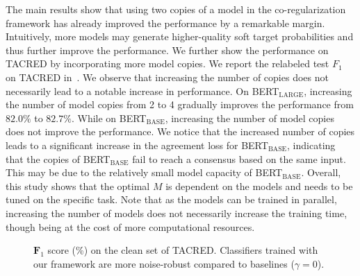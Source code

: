 \documentclass[11pt]{article}
\newcommand{\stitle}[1]{\vspace{0.3em}\noindent{\bf #1}}
\begin{document}
\stitle{Using extra model copies.} The main results show that using two copies of a model in the co-regularization framework has already improved the performance by a remarkable margin.
Intuitively, more models may generate higher-quality soft target probabilities and thus further improve the performance.
We further show the performance on TACRED by incorporating more model copies.
We report the relabeled test $F_1$ on TACRED in~.
We observe that increasing the number of copies does not necessarily lead to a notable increase in performance.
On BERT$_\text{LARGE}$, increasing the number of model copies from 2 to 4 gradually improves the performance from $82.0\%$ to $82.7\%$.
While on BERT$_\text{BASE}$, increasing the number of model copies does not improve the performance.
We notice that the increased number of copies leads to a significant increase in the agreement loss for BERT$_\text{BASE}$, indicating that the copies of BERT$_\text{BASE}$ fail to reach a consensus based on the same input.
This may be due to the relatively small model capacity of BERT$_\text{BASE}$.
Overall, this study shows that the optimal $M$ is dependent on the models and needs to be tuned on the specific task.
Note that as the models can be trained in parallel, increasing the number of models does not necessarily increase the training time, though being at the cost of more computational resources.


\begin{figure}[t!]
    \centering
\caption{$\bm{F}_1$ score (\%) on the clean set of TACRED. Classifiers trained with our framework are more noise-robust compared to baselines ($\gamma=0$).}\label{fig:noise}
\end{figure}

\begin{table}[t]
    \centering
    \caption{$\bm{F_1}$ score (\%) of using different number of models on the relabeled test set of TACRED.}
    \label{tab:more_models}
\end{table}
\end{document}
